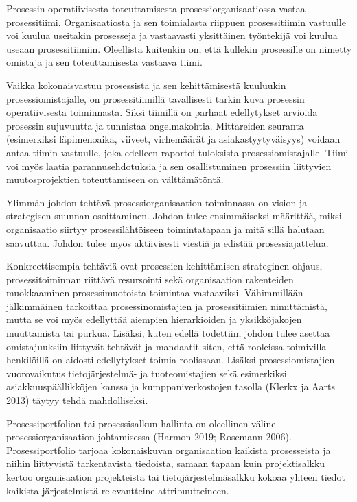 \documentclass[
  finnish,
  letterpaper,
  DIV=11,
  numbers=noendperiod,
  oneside]{scrreprt}
\begin{document}
Prosessin operatiivisesta toteuttamisesta prosessiorganisaatiossa vastaa
prosessitiimi. Organisaatiosta ja sen toimialasta riippuen
prosessitiimin vastuulle voi kuulua useitakin prosesseja ja vastaavasti
yksittäinen työntekijä voi kuulua useaan prosessitiimiin. Oleellista
kuitenkin on, että kullekin prosessille on nimetty omistaja ja sen
toteuttamisesta vastaava tiimi.

Vaikka kokonaisvastuu prosessista ja sen kehittämisestä kuuluukin
prosessiomistajalle, on prosessitiimillä tavallisesti tarkin kuva
prosessin operatiivisesta toiminnasta. Siksi tiimillä on parhaat
edellytykset arvioida prosessin sujuvuutta ja tunnistaa ongelmakohtia.
Mittareiden seuranta (esimerkiksi läpimenoaika, viiveet, virhemäärät ja
asiakastyytyväisyys) voidaan antaa tiimin vastuulle, joka edelleen
raportoi tuloksista prosessiomistajalle. Tiimi voi myös laatia
parannusehdotuksia ja sen osallistuminen prosessiin liittyvien
muutosprojektien toteuttamiseen on välttämätöntä.

Ylimmän johdon tehtävä prosessiorganisaation toiminnassa on vision ja
strategisen suunnan osoittaminen. Johdon tulee ensimmäiseksi määrittää,
miksi organisaatio siirtyy prosessilähtöiseen toimintatapaan ja mitä
sillä halutaan saavuttaa. Johdon tulee myös aktiivisesti viestiä ja
edistää prosessiajattelua.

Konkreettisempia tehtäviä ovat prosessien kehittämisen strateginen
ohjaus, prosessitoiminnan riittävä resursointi sekä organisaation
rakenteiden muokkaaminen prosessimuotoista toimintaa vastaaviksi.
Vähimmillään jälkimmäinen tarkoittaa prosessinomistajien ja
prosessitiimien nimittämistä, mutta se voi myös edellyttää aiempien
hierarkioiden ja yksikköjakojen muuttamista tai purkua. Lisäksi, kuten
edellä todettiin, johdon tulee asettaa omistajuuksiin liittyvät tehtävät
ja mandaatit siten, että rooleissa toimivilla henkilöillä on aidosti
edellytykset toimia roolissaan. Lisäksi prosessiomistajien vuorovaikutus
tietojärjestelmä- ja tuoteomistajien sekä esimerkiksi
asiakkuuspäällikköjen kanssa ja kumppaniverkostojen tasolla (Klerkx ja
Aarts 2013) täytyy tehdä mahdolliseksi.

Prosessiportfolion tai prosessisalkun hallinta on oleellinen väline
prosessiorganisaation johtamisessa (Harmon 2019; Rosemann 2006).
Prosessiportfolio tarjoaa kokonaiskuvan organisaation kaikista
prosesseista ja niihin liittyvistä tarkentavista tiedoista, samaan
tapaan kuin projektisalkku kertoo organisaation projekteista tai
tietojärjestelmäsalkku kokoaa yhteen tiedot kaikista järjestelmistä
relevantteine attribuutteineen.
\end{document}
